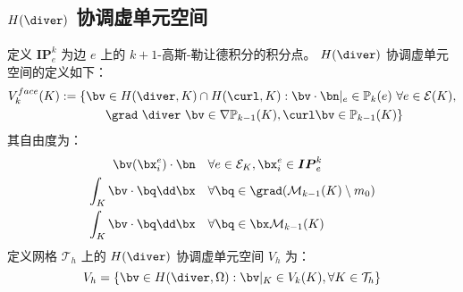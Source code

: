 \subsection{$H(\diver)$ 协调虚单元空间}
定义 $\boldsymbol{IP}^{k}_e$ 为边 $e$ 上的 $k+1$-高斯-勒让德积分的积分点。
$H(\diver)$ 协调虚单元空间的定义如下：
$$
\begin{aligned}
V_{k}^{face}(K) := \{\bv & \in H(\diver, K)\cap H(\curl, K): \bv\cdot\bn|_e \in 
    \mathbb{P}_k(e) \ \forall e \in \mathcal{E}(K), \\
    & \grad\ \diver\ \bv \in \nabla \mathbb{P}_{k-1}(K), \curl \bv \in 
    \mathbb{P}_{k-1}(K)\}
\end{aligned}
$$
其自由度为：
$$
\begin{aligned}
    \bv(\bx_i^e)\cdot \bn & \quad \forall e \in \mathcal{E}_K, \bx_i^e\in
    \boldsymbol{IP}^{k}_e\\
    \int_K \bv \cdot \bq \dd \bx & \quad \forall \bq \in
    \grad(\mathcal{M}_{k-1}(K)\setminus m_0)\\
    \int_K \bv \cdot \bq \dd \bx & \quad \forall \bq \in
    \bx\mathcal{M}_{k-1}(K)
\end{aligned}
$$
定义网格 $\mathcal{T}_h$ 上的 $H(\diver)$ 协调虚单元空间 $V_h$ 为：
$$
V_h = \{\bv \in H(\diver, \Omega): \bv|_K \in V_k(K), \forall K \in
\mathcal{T}_h\}
$$

